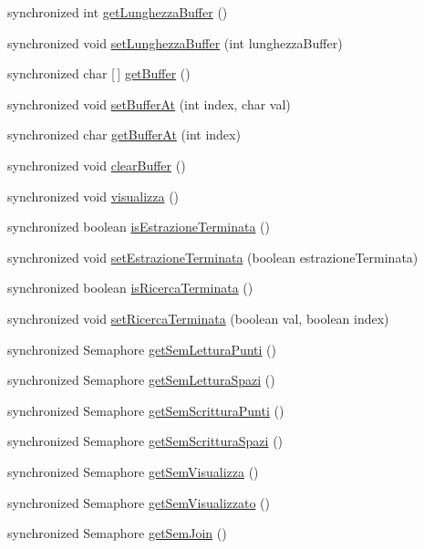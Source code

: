 \begin{DoxyCompactItemize}
\item 
synchronized int \mbox{\hyperlink{classmain_1_1_shared_data_a2f606346e7f2ae2e2da2ad211c0bf08a}{get\+Lunghezza\+Buffer}} ()
\item 
synchronized void \mbox{\hyperlink{classmain_1_1_shared_data_a9f4674222bb12c6275156d82033cf17c}{set\+Lunghezza\+Buffer}} (int lunghezza\+Buffer)
\item 
synchronized char \mbox{[}$\,$\mbox{]} \mbox{\hyperlink{classmain_1_1_shared_data_a834679087d3e57272392eaf389f13a80}{get\+Buffer}} ()
\item 
synchronized void \mbox{\hyperlink{classmain_1_1_shared_data_a72a099def4ea0fd3499ed5b33a493245}{set\+Buffer\+At}} (int index, char val)
\item 
synchronized char \mbox{\hyperlink{classmain_1_1_shared_data_acdbb1bf0749f6d59ec74661b16cb10f7}{get\+Buffer\+At}} (int index)
\item 
synchronized void \mbox{\hyperlink{classmain_1_1_shared_data_a00aedde57a20e2963ebc672ae9ce97d4}{clear\+Buffer}} ()
\item 
synchronized void \mbox{\hyperlink{classmain_1_1_shared_data_a0e899cc4037a80b857974e1b46c208bf}{visualizza}} ()
\item 
synchronized boolean \mbox{\hyperlink{classmain_1_1_shared_data_ae7e5f776048f84d07787d62c1ddcf7d0}{is\+Estrazione\+Terminata}} ()
\item 
synchronized void \mbox{\hyperlink{classmain_1_1_shared_data_a7e4be6ed2e568675410bd1666d4bad43}{set\+Estrazione\+Terminata}} (boolean estrazione\+Terminata)
\item 
synchronized boolean \mbox{\hyperlink{classmain_1_1_shared_data_a1cd83a707b62e4056055fd1c6ebba2b0}{is\+Ricerca\+Terminata}} ()
\item 
synchronized void \mbox{\hyperlink{classmain_1_1_shared_data_a8fb1402b905776d228577eee7cdb826f}{set\+Ricerca\+Terminata}} (boolean val, boolean index)
\item 
synchronized Semaphore \mbox{\hyperlink{classmain_1_1_shared_data_a3635e525daf3f0e52187d20e37c90f68}{get\+Sem\+Lettura\+Punti}} ()
\item 
synchronized Semaphore \mbox{\hyperlink{classmain_1_1_shared_data_a218db8263ccc5317ba83f2e4ad2d49c8}{get\+Sem\+Lettura\+Spazi}} ()
\item 
synchronized Semaphore \mbox{\hyperlink{classmain_1_1_shared_data_ae0afb630593f701a83c77bc1ecc12e7b}{get\+Sem\+Scrittura\+Punti}} ()
\item 
synchronized Semaphore \mbox{\hyperlink{classmain_1_1_shared_data_a10670dfbf4c72ab35617e5ee0d73271d}{get\+Sem\+Scrittura\+Spazi}} ()
\item 
synchronized Semaphore \mbox{\hyperlink{classmain_1_1_shared_data_aa61763e3e67d28f279815eda9e81e0bd}{get\+Sem\+Visualizza}} ()
\item 
synchronized Semaphore \mbox{\hyperlink{classmain_1_1_shared_data_a3bc58a39321bc72c013baca2abb19a0a}{get\+Sem\+Visualizzato}} ()
\item 
synchronized Semaphore \mbox{\hyperlink{classmain_1_1_shared_data_a853d0d6001de0c0e8f81c9ab5020c292}{get\+Sem\+Join}} ()
\end{DoxyCompactItemize}
